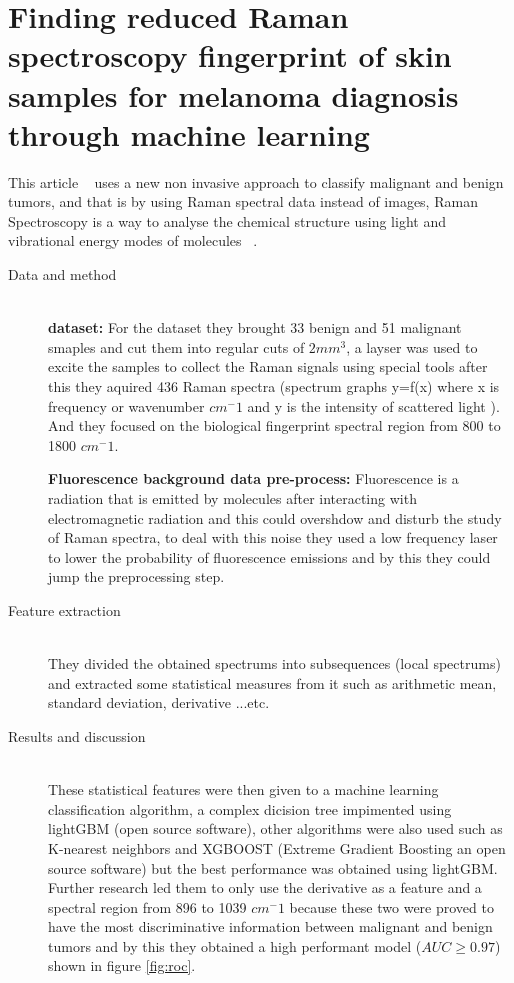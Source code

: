 
\section{Finding reduced Raman spectroscopy fingerprint of skin samples for melanoma diagnosis through machine learning}
    This article ~\cite{Daniella2021} uses a new non invasive approach to classify malignant and benign tumors, and that is by using Raman spectral data instead of images, Raman Spectroscopy is a way to analyse the chemical structure using light and vibrational energy modes of molecules ~\cite{Edinburgh}.
\begin{description}
\item[Data and method] \hfill \\
    
    \textbf{dataset: }
    For the dataset they brought 33 benign and 51 malignant smaples and cut them into regular cuts of $2mm^3$, a layser was used to excite the samples to collect the Raman signals using special tools after this they aquired 436 Raman spectra (spectrum graphs y=f(x) where x is frequency or wavenumber $cm^-1$ and y is the intensity of scattered light ). And they focused on the biological fingerprint spectral region from 800 to 1800 $cm^-1$.

    \textbf{Fluorescence background data pre-process: }
    Fluorescence is a radiation that is emitted by molecules after interacting with electromagnetic radiation and this could overshdow and disturb the study of Raman spectra, to deal with this noise they used a low frequency laser to lower the probability of fluorescence emissions and by this they could jump the preprocessing step.
\item[Feature extraction] \hfill \\
    They divided the obtained spectrums into subsequences (local spectrums) and extracted some statistical measures from it such as arithmetic mean, standard deviation, derivative ...etc.

\item[Results and discussion] \hfill \\
    These statistical features were then given to a machine learning classification algorithm, a complex dicision tree impimented using lightGBM (open source software), other algorithms were also used such as K-nearest neighbors and XGBOOST (Extreme Gradient Boosting an open source software) but the best performance was obtained using lightGBM.
    Further research led them to only use the derivative as a feature and a spectral region from 896 to 1039 $cm^-1$ because these two were proved to have the most discriminative information between malignant and benign tumors and by this they obtained a high performant model ($AUC \geq 0.97$) shown in figure \ref{fig:roc}.
\end{description}

